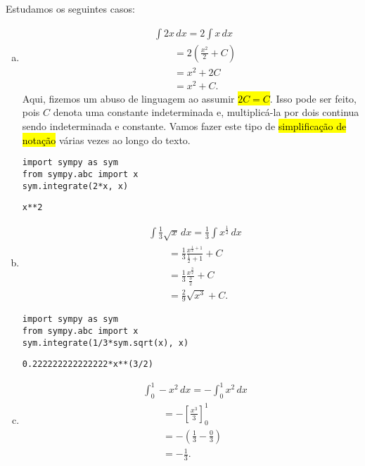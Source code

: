 \begin{ex}
  Estudamos os seguintes casos:
  \begin{enumerate}[a)]
  \item
    \begin{align}
      & \int 2x\,dx = 2\int x\,dx\\
      &\text{}\qquad = 2\left(\frac{x^2}{2} + C\right)\\
      &\text{}\qquad = x^2 + 2C\\
      &\text{}\qquad = x^2 + C.
    \end{align}
    Aqui, fizemos um abuso de linguagem ao assumir \hl{$2C = C$}. Isso pode ser feito, pois $C$ denota uma constante indeterminada e, multiplicá-la por dois continua sendo indeterminada e constante. Vamos fazer este tipo de \hl{simplificação de notação} várias vezes ao longo do texto.

\begin{lstlisting}
import sympy as sym
from sympy.abc import x
sym.integrate(2*x, x)
\end{lstlisting}

\begin{verbatim}
x**2
\end{verbatim}

\item
    \begin{align}
      & \int \frac{1}{3}\sqrt{x}\,dx = \frac{1}{3}\int x^{\frac{1}{2}}\,dx\\
      &\text{}\qquad = \frac{1}{3}\frac{x^{\frac{1}{2}+1}}{\frac{1}{2}+1} + C\\
      &\text{}\qquad = \frac{1}{3}\frac{x^{\frac{3}{2}}}{\frac{3}{2}} + C\\
      &\text{}\qquad = \frac{2}{9}\sqrt{x^3} + C.
    \end{align}

\begin{lstlisting}
import sympy as sym
from sympy.abc import x
sym.integrate(1/3*sym.sqrt(x), x)
\end{lstlisting}

\begin{verbatim}
0.222222222222222*x**(3/2)
\end{verbatim}

  \item
    \begin{align}
      & \int_0^{1}-x^2\,dx = -\int_0^1x^2\,dx \\
      &\text{}\qquad = -\left[\frac{x^3}{3}\right]_0^1 \\
      &\text{}\qquad = -\left(\frac{1}{3} - \frac{0}{3}\right) \\
      &\text{}\qquad = -\frac{1}{3}.
    \end{align}


\end{enumerate}
\end{ex}
